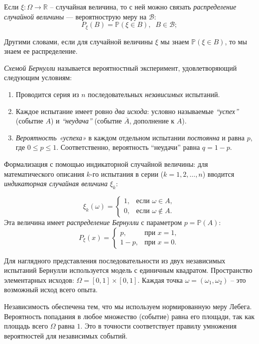 \documentclass[12pt,a4paper]{article}
\begin{document}
\begin{definition}
    Если \(\xi : \Omega \to \mathbb{R}\) -- случайная величина, то с ней можно связать \textit{распределение случайной величины} --- вероятнострую меру на \(\mathcal{B}\): \[P_{\xi}(B) = \mathbb{P}(\xi \in B), \; \; B \in \mathcal{B};\]
\end{definition}

\begin{remark}
    Другими словами, если для случайной величины \(\xi\) мы знаем \(\mathbb{P}(\xi \in B)\), то мы знаем ее распределение.
\end{remark}

\begin{definition}
    \textit{Схемой Бернулли} называется вероятностный эксперимент, удовлетворяющий следующим условиям:

\begin{enumerate}
    \item Проводится серия из $n$ последовательных \textit{независимых} испытаний.
    \item Каждое испытание имеет ровно \textit{два исхода}: условно называемые \textit{``успех''} (событие $A$) и \textit{``неудача''} (событие $\overline{A}$, дополнение к $A$).
    \item \textit{Вероятность «успеха»} в каждом отдельном испытании \textit{постоянна} и равна $p$, где $0 \leq p \leq 1$. Соответственно, вероятность ``неудачи'' равна $q = 1 - p$.
\end{enumerate}
Формализация с помощью индикаторной случайной величины: для математического описания $k$-го испытания в серии ($k = 1, 2, \dots, n$) вводится \textit{индикаторная случайная величина} $\xi_k$:

\[
\xi_k(\omega) = 
\begin{cases}
1, & \text{если } \omega \in A, \\
0, & \text{если } \omega \notin A .
\end{cases}
\]
Эта величина имеет \textit{распределение Бернулли} с параметром $p = \mathbb{P}(A)$:
\[
P_{\xi}(x) = 
\begin{cases}
p, & \text{при } x = 1, \\
1 - p, & \text{при } x = 0.
\end{cases}
\]
\end{definition}

\begin{example}[Геометрическая модель схемы Бернулли для \(n = 2\)]
    Для наглядного представления последовательности из двух независимых испытаний Бернулли используется модель с единичным квадратом. Пространство элементарных исходов: \( \Omega = [0, 1] \times [0,1]\). Каждая точка \(\omega = (\omega_1, \omega_2)\) -- это возможный исход всего опыта.

    Независимость обеспечена тем, что мы используем нормированную меру Лебега. Вероятность попадания в любое множество (событие) равна его площади, так как площадь всего \(\Omega\) равна \(1\). Это в точности соответствует правилу умножения вероятностей для независимых событий.
\end{example}
\end{document}
